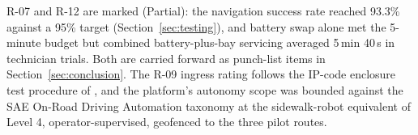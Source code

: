 R-07 and R-12 are marked  (Partial): the navigation success rate
reached 93.3\% against a 95\% target (Section~\ref{sec:testing}), and battery
swap alone met the 5-minute budget but combined battery-plus-bay servicing
averaged 5\,min 40\,s in technician trials. Both are carried forward as
punch-list items in Section~\ref{sec:conclusion}. The R-09 ingress rating
follows the IP-code enclosure test procedure of \citet{iec_ip_rating}, and
the platform's autonomy scope was bounded against the SAE On-Road Driving
Automation taxonomy \citep{sae_j3016_2021} at the sidewalk-robot equivalent
of Level 4, operator-supervised, geofenced to the three pilot routes.
